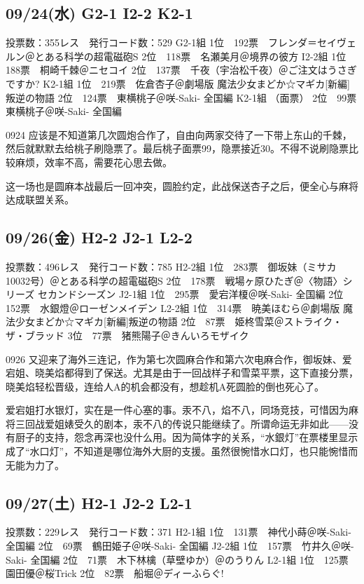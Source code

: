 \subsection{09/24(水) G2-1 I2-2 K2-1}

	投票数：355レス　発行コード数：529
	G2-1組
	1位　192票　フレンダ＝セイヴェルン＠とある科学の超電磁砲S
	2位　118票　名瀬美月＠境界の彼方
	I2-2組
	1位　188票　桐崎千棘＠ニセコイ
	2位　137票　千夜（宇治松千夜）＠ご注文はうさぎですか?
	K2-1組
	1位　219票　佐倉杏子＠劇場版 魔法少女まどか☆マギカ[新編]叛逆の物語
	2位　124票　東横桃子＠咲-Saki- 全国編
	K2-1組 （面票）
	2位　99票　東横桃子＠咲-Saki- 全国編

0924 应该是不知道第几次圆炮合作了，自由向两家交待了一下带上东山的千棘，然后就默默去给桃子刷隐票了。最后桃子面票99，隐票接近30。不得不说刷隐票比较麻烦，效率不高，需要花心思去做。

这一场也是圆麻本战最后一回冲突，圆脸约定，此战保送杏子之后，便全心与麻将达成联盟关系。

\subsection{09/26(金) H2-2 J2-1 L2-2}

	投票数：496レス　発行コード数：785
	H2-2組
	1位　283票　御坂妹（ミサカ10032号）＠とある科学の超電磁砲S
	2位　178票　戦場ヶ原ひたぎ＠〈物語〉シリーズ セカンドシーズン
	J2-1組
	1位　295票　愛宕洋榎＠咲-Saki- 全国編
	2位　152票　水銀燈＠ローゼンメイデン
	L2-2組
	1位　314票　暁美ほむら＠劇場版 魔法少女まどか☆マギカ[新編]叛逆の物語
	2位　87票　姫柊雪菜＠ストライク・ザ・ブラッド
	3位　77票　猪熊陽子＠きんいろモザイク

0926 又迎来了海外三连记，作为第七次圆麻合作和第六次电麻合作，御坂妹、爱宕姐、晓美焰都得到了保送。尤其是由于一回战样子和雪菜平票，这下直接分票，晓美焰轻松晋级，连给人A的机会都没有，想趁机A死圆脸的倒也死心了。

爱宕姐打水银灯，实在是一件心塞的事。汞不八，焰不八，同场竞技，可惜因为麻将三回战爱姐婊受久的剧本，汞不八的传说只能继续了。所谓命运无非如此——没有厨子的支持，怨念再深也没什么用。因为简体字的关系，“水銀灯”在票楼里显示成了“水口灯”，不知道是哪位海外大厨的支援。虽然很惋惜水口灯，也只能惋惜而无能为力了。

\subsection{09/27(土) H2-1 J2-2 L2-1}

	投票数：229レス　発行コード数：371
	H2-1組
	1位　131票　神代小蒔＠咲-Saki- 全国編
	2位　69票　鶴田姫子＠咲-Saki- 全国編
	J2-2組
	1位　157票　竹井久＠咲-Saki- 全国編
	2位　71票　木下林檎（草壁ゆか）＠のうりん
	L2-1組
	1位　125票　園田優＠桜Trick
	2位　82票　船堀＠ディーふらぐ!

